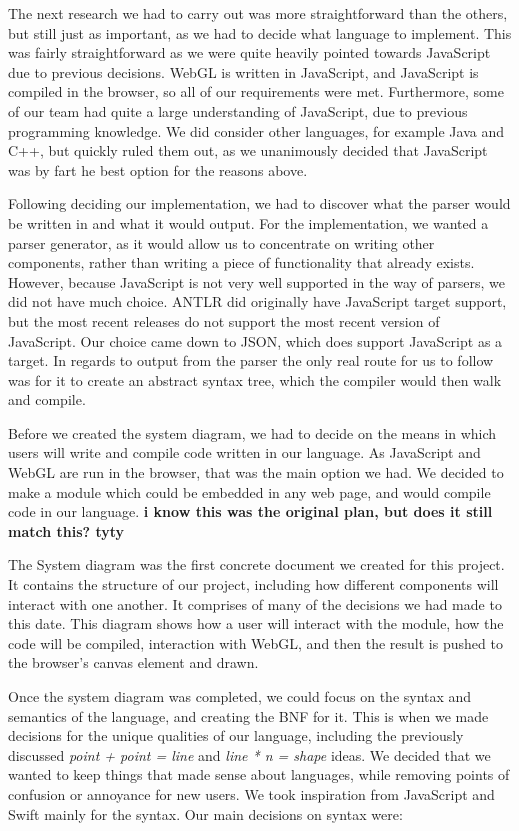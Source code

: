 \documentclass{l3proj}
\begin{document}
The next research we had to carry out was more straightforward than the others, but still just as important, as we had to decide what language to implement. This was fairly straightforward as we were quite heavily pointed towards JavaScript due to previous decisions. WebGL is written in JavaScript, and JavaScript is compiled in the browser, so all of our requirements were met. Furthermore, some of our team had quite a large understanding of JavaScript, due to previous programming knowledge. We did consider other languages, for example Java and C++, but quickly ruled them out, as we unanimously decided that JavaScript was by fart he best option for the reasons above. 

Following deciding our implementation, we had to discover what the parser would be written in and what it would output. For the implementation, we wanted a parser generator, as it would allow us to concentrate on writing other components, rather than writing a piece of functionality that already exists. However, because JavaScript is not very well supported in the way of parsers, we did not have much choice. ANTLR did originally have JavaScript target support, but the most recent releases do not support the most recent version of JavaScript. Our choice came down to JSON, which does support JavaScript as a target. In regards to output from the parser the only real route for us to follow was for it to create an abstract syntax tree, which the compiler would then walk and compile.

Before we created the system diagram, we had to decide on the means in which users will write and compile code written in our language. As JavaScript and WebGL are run in the browser, that was the main option we had. We decided to make a module which could be embedded in any web page, and would compile code in our language. \textbf{i know this was the original plan, but does it still match this? tyty}

The System diagram was the first concrete document we created for this project. It contains the structure of our project, including how different components will interact with one another. It comprises of many of the decisions we had made to this date. This diagram shows how a user will interact with the module, how the code will be compiled, interaction with WebGL, and then the result is pushed to the browser's canvas element and drawn.

Once the system diagram was completed, we could focus on the syntax and semantics of the language, and creating the BNF for it. This is when we made decisions for the unique qualities of our language, including the previously discussed \textit{point + point = line} and \textit{line * n = shape} ideas. We decided that we wanted to keep things that made sense about languages, while removing points of confusion or annoyance for new users. We took inspiration from JavaScript and Swift mainly for the syntax. Our main decisions on syntax were:
\end{document}
